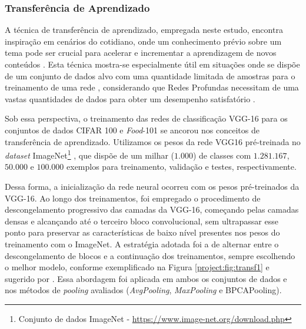 \subsubsection{Transferência de Aprendizado}
\label{project:transf}
A técnica de transferência de aprendizado, empregada neste estudo, encontra inspiração em cenários do cotidiano, onde um conhecimento prévio sobre um tema pode ser crucial para acelerar e incrementar a aprendizagem de novos conteúdos \citep{Pan2010}. Esta técnica mostra-se especialmente útil em situações onde se dispõe de um conjunto de dados alvo com uma quantidade limitada de amostras para o treinamento de uma rede \citep{Weiss2016}, considerando que Redes Profundas necessitam de uma vastas quantidades de dados para obter um desempenho satisfatório \citep{Goodfellow2016}.

Sob essa perspectiva, o treinamento das redes de classificação VGG-16 para os conjuntos de dados CIFAR 100 e \textit{Food}-101 se ancorou nos conceitos de transferência de aprendizado. Utilizamos os pesos da rede VGG16 pré-treinada no \textit{dataset} ImageNet\footnote{Conjunto de dados ImageNet - \url{https://www.image-net.org/download.php}} \citep{Deng2009ImageNet:Database}, que dispõe de um milhar ($1.000$) de classes com $1.281.167$, $50.000$ e $100.000$ exemplos para treinamento, validação e testes, respectivamente.

Dessa forma, a inicialização da rede neural ocorreu com os pesos pré-treinados da VGG-16. Ao longo dos treinamentos, foi empregado o procedimento de descongelamento progressivo das camadas da VGG-16, começando pelas camadas densas e alcançando até o terceiro bloco convolucional, sem ultrapassar esse ponto para preservar as características de baixo nível presentes nos pesos do treinamento com o ImageNet. A estratégia adotada foi a de alternar entre o descongelamento de blocos e a continuação dos treinamentos, sempre escolhendo o melhor modelo, conforme exemplificado na Figura \ref{project:fig:transf1} e sugerido por \cite{Chollet2021DeepPython}. Essa abordagem foi aplicada em ambos os conjuntos de dados e nos métodos de \textit{pooling} avaliados (\textit{AvgPooling}, \textit{MaxPooling} e BPCAPooling).

